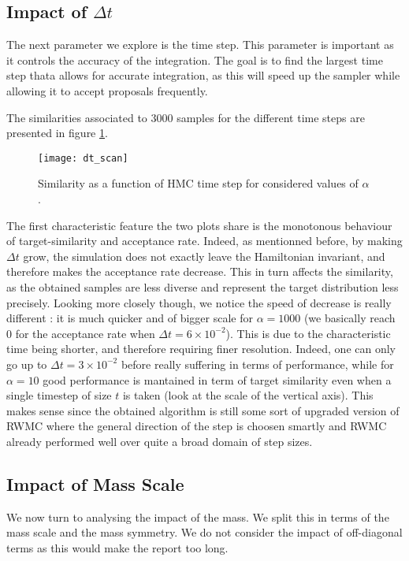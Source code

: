 \documentclass[a4paper, 12pt,oneside]{article}
\begin{document}
			\subsection{Impact of $\Delta t$}
			The next parameter we explore is the time step. This parameter is important as it controls the accuracy of the integration. The goal is to find the largest time step thata allows for accurate integration, as this will speed up the sampler while allowing it to accept proposals frequently.

			The similarities associated to 3000 samples for the different time steps are presented in figure \ref{fig:dt-scan}.
			\begin{figure}[htb]
				\centering
					\vspace{0em}
					\texttt{[image: dt\_scan]}
					\caption{Similarity as a function of HMC time step for considered values of $\alpha$.}
					\label{fig:dt-scan}
			\end{figure}
			The first characteristic feature the two plots share is the monotonous behaviour of target-similarity and acceptance rate. Indeed, as mentionned before, by making $\Delta t$ grow, the simulation does not exactly leave the Hamiltonian invariant, and therefore makes the acceptance rate decrease. This in turn affects the similarity, as the obtained samples are less diverse and represent the target distribution less precisely.  
			Looking more closely though, we notice the speed of decrease is really different : it is much quicker and of bigger scale for $\alpha=1000$ (we basically reach 0 for the acceptance rate when $\Delta t=6\times 10^{-2}$). This is due to the characteristic time being shorter, and therefore requiring finer resolution. Indeed, one can only go up to $\Delta t=3\times 10^{-2}$ before really suffering in terms of performance, while for $\alpha=10$ good performance is mantained in term of target similarity even when a single timestep of size $t$ is taken (look at the scale of the vertical axis). This makes sense since the obtained algorithm is still some sort of upgraded version of RWMC where the general direction of the step is choosen smartly and RWMC already performed well over quite a broad domain of step sizes.   
			\subsection{Impact of Mass Scale}
			We now turn to analysing the impact of the mass. We split this in terms of the mass scale and the mass symmetry. We do not consider the impact of off-diagonal terms as this would make the report too long. 
\end{document}
